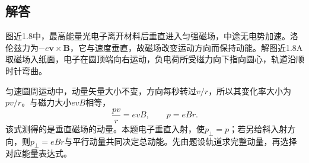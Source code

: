 \documentclass[UTF8,fontset=fandol,a4paper,11pt]{ctexart}
\begin{document}
\subsection*{解答}


图近1.8中，最高能量光电子离开材料后垂直进入匀强磁场，中途无电势加速。洛伦兹力为$-e\boldsymbol v\times\boldsymbol B$，它与速度垂直，故磁场改变运动方向而保持动能。解图近1.8A取磁场入纸面，电子在圆顶端向右运动，负电荷所受磁力向下指向圆心，轨道沿顺时针弯曲。

匀速圆周运动中，动量矢量大小不变，方向每秒转过$v/r$，所以其变化率大小为$pv/r$。与磁力大小$evB$相等，
\[
\frac{pv}{r}=evB,\qquad \boxed{p=eBr}.
\]
该式测得的是垂直磁场的动量。本题电子垂直入射，使$p_\perp=p$；若另给斜入射方向，则$p_\perp=eBr$与平行动量共同决定总动能。先由题设轨道求完整动量，再选择对应能量表达式。
\begin{center}\begin{minipage}{.98\linewidth}\centering
\begin{tikzpicture}[scale=.95,transform shape]

\end{tikzpicture}
\end{minipage}
\end{center}
\end{document}
